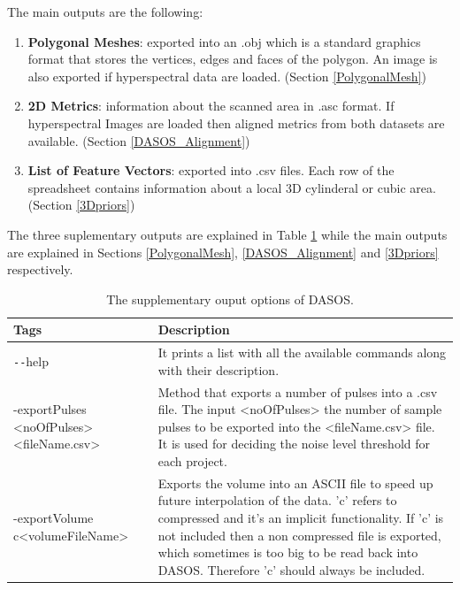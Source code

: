 \documentclass{subfiles}
\begin{document}
			\par The main outputs are the following:
			\begin{enumerate}
				\item \textbf{Polygonal Meshes}: exported into an .obj which is a standard graphics format that stores the vertices, edges and faces of the polygon. An image is also exported if hyperspectral data are loaded. (Section \ref{PolygonalMesh})
				\item \textbf{2D Metrics}: information about the scanned area in .asc format. If hyperspectral Images are loaded then aligned metrics from both datasets are available. (Section \ref{DASOS_Alignment})
				\item \textbf{List of Feature Vectors}: exported into .csv files. Each row of the spreadsheet contains information about a local 3D cylinderal or cubic area. (Section \ref{3Dpriors})
			\end{enumerate} 
		
		The three suplementary outputs are explained in Table \ref{table:supTags} while the main outputs are explained in Sections \ref{PolygonalMesh}, \ref{DASOS_Alignment} and \ref{3Dpriors} respectively.
		\begin{table}[!htbp]
			\centering
			\begin{tabular}{|p{2.9cm}|p{10.8cm}|}
				\toprule
				\textbf{Tags}  & \textbf{Description}  \\
				\midrule
				\texttt{-{}-}help & It prints a list with all the available commands along with their description.\\
				\midrule
				-exportPulses  \newline<fileName.csv> & Method that exports a number of pulses into a .csv file. The input <noOfPulses> the number of sample pulses to be exported into the <fileName.csv> file. It is used for deciding the noise level threshold for each project. \\
				\cmidrule(r){1-1}\cmidrule(l){2-2}
				-exportVolume c\newline <volumeFileName> & Exports the volume into an ASCII file to speed up future interpolation of the data. 'c' refers to compressed and it's an implicit functionality. If 'c' is not included then a non compressed file is exported, which sometimes is too big to be read back into DASOS. Therefore 'c' should always be included. \\	
				\bottomrule		
			\end{tabular}
			\caption{The supplementary ouput options of DASOS.}
			\label{table:supTags}
		\end{table}
	
\end{document}
